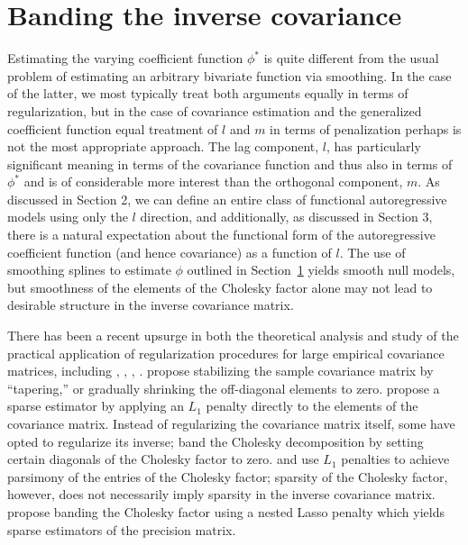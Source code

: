 \documentclass[12pt]{article}
\theoremstyle{definition}
\begin{document}
\section{Banding the inverse covariance}

Estimating the varying coefficient function $\phi^*$ is quite different from the usual problem of estimating an arbitrary bivariate function via smoothing. In the case of the latter, we most typically treat both arguments equally in terms of regularization, but in the case of covariance estimation and the generalized coefficient function equal treatment of $l$ and $m$ in terms of penalization perhaps is not the most appropriate approach. The lag component, $l$, has particularly significant meaning in terms of the covariance function and thus also in terms of $\phi^*$ and is of considerable more interest than the orthogonal component, $m$. As discussed in Section 2, we can define an entire class of functional autoregressive models using only the $l$ direction, and additionally, as discussed in Section 3, there is a natural expectation about the functional form of the autoregressive coefficient function (and hence covariance) as a function of $l$. The use of smoothing splines to estimate $\phi$ outlined in Section~\ref{} yields smooth null models, but smoothness of the elements of the Cholesky factor alone may not lead to desirable structure in the inverse covariance matrix.  

There has been a recent upsurge in both the theoretical analysis and study of the practical application of regularization procedures for large empirical covariance matrices, including \citet{huang2006covariance}, \citet{furrer2007estimation}, \citet{fan2008high}, \citet{ledoit2004well}.  \citet{furrer2007estimation} propose stabilizing the sample covariance matrix by ``tapering,'' or gradually shrinking the off-diagonal elements to zero. \citet{d2008first} propose a sparse estimator by applying an $L_1$ penalty directly to the elements of the covariance matrix. Instead of regularizing the covariance matrix itself, some have opted to regularize its inverse;  \cite{wu2003nonparametric} band the Cholesky decomposition  by setting certain diagonals of the Cholesky factor to zero. \citet{huang2006covariance} and \citet{levina2008sparse} use $L_1$ penalties to achieve parsimony of the entries of the Cholesky factor; sparsity of the Cholesky factor, however, does not necessarily imply sparsity in the inverse covariance matrix. \citet{levina2008sparse} propose banding the Cholesky factor using a nested Lasso penalty which yields sparse estimators of the precision matrix.  
\end{document}

